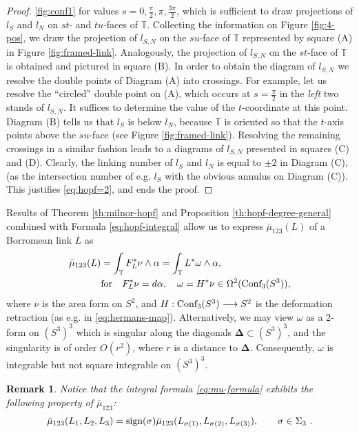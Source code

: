 \documentclass[12pt]{article}
\numberwithin{equation}{section}
\newtheorem{rem}[theorem]{Remark}
\newenvironment{remark}{\begin{rem} \rm}{\end{rem}}
\newcommand{\Cnf}{\text{\rm Conf}}
\newcommand{\no}{\noindent}
\begin{document}
\begin{proof}
\ref{fig:conf1} for values $s=0, \frac{\pi}{2}, \pi,
\frac{3\pi}{2}$, which is sufficient to draw projections of $l_S$ and $l_N$ on $st$- and $tu$-faces of $\mathbb{T}$.  Collecting the information on Figure \ref{fig:4-pos}, we draw the projection of
$l_{S,N}$ on the $su$-face of $\mathbb{T}$ represented
by square (A) in Figure \ref{fig:framed-link}. Analogously, the projection of 
$l_{S,N}$ on the $st$-face of $\mathbb{T}$ is obtained  and pictured in square (B).
In order to obtain the diagram of
$l_{S,N}$ we resolve the double points of Diagram (A) into crossings. For example, let us resolve the 
``circled'' double point on (A), which occurs at $s=\frac{\pi}{2}$ in the \emph{left} two stands of $l_{S,N}$. It suffices to determine the value of the $t$-coordinate at this point.
Diagram (B) tells us that $l_S$ is below $l_N$, because $\mathbb{T}$ is oriented so that the $t$-axis points above the $su$-face (see Figure \ref{fig:framed-link}).
 Resolving the remaining crossings in
a similar fashion leads to a diagrams of $l_{S,N}$ presented in squares (C) and (D). 
 Clearly, the linking number of
$l_S$ and $l_N$ is equal to $\pm 2$ in Diagram (C), (as the intersection number of e.g. $l_S$ with the obvious annulus on Diagram (C)). This justifies \eqref{eq:hopf=2}, and ends the proof.
\end{proof}
 
\no Results of Theorem \ref{th:milnor-hopf} and Proposition \ref{th:hopf-degree-general} combined with Formula \eqref{eq:hopf-integral} allow us to express $\bar{\mu}_{123}(L)$ of a Borromean link $L$ as
 \begin{equation}\label{eq:mu-formula}
 \begin{split}
  \bar{\mu}_{123}(L) & =  \int_{\mathbb{T}} F^\ast_L\nu\wedge \alpha=\int_{\mathbb{T}} L^\ast\omega\wedge \alpha,\\
  & \text{for}   \quad F^\ast_L\nu=d\alpha,\quad \omega=H^\ast\nu\in \Omega^2(\Cnf_3(S^3)),
  \end{split}
 \end{equation}
 where $\nu$ is the area form on $S^2$, and $H:\Cnf_3(S^3)\longrightarrow S^2$ is the deformation retraction 
 (as e.g. in \eqref{eq:hermans-map}). Alternatively, we may view $\omega$ as a 2-form on $(S^3)^3$ which is singular along 
 the diagonals $\mathbf{\Delta}\subset (S^3)^3$, and the singularity is of order $O(r^2)$, where $r$ is a distance to $\mathbf{\Delta}$. Consequently, $\omega$ is integrable but not square integrable on $(S^3)^3$. 

 
\begin{remark}\label{rem:anti-symmetry}
  Notice that the integral formula \eqref{eq:mu-formula} exhibits the following property of $\bar{\mu}_{123}$:
   \[
  \bar{\mu}_{123}(L_1,L_2,L_3)=\text{\rm sign}(\sigma)\bar{\mu}_{123}(L_{\sigma(1)},L_{\sigma(2)},L_{\sigma(3)}),\qquad \sigma\in\Sigma_3\ .
 \]
\end{remark}
\end{document}
